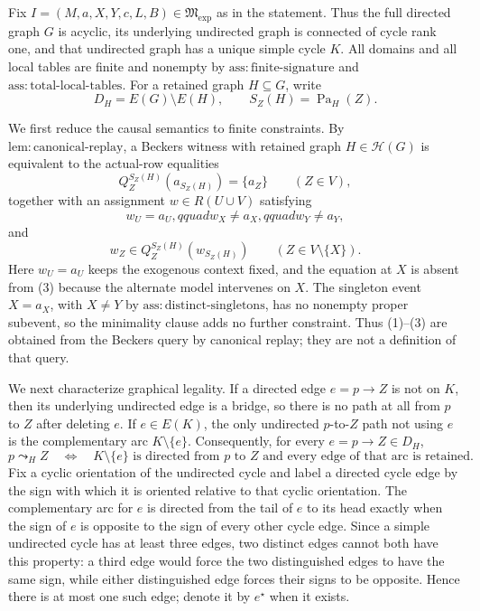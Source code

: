 Fix \(I=(M,a,X,Y,c,L,B)\in\mathfrak M_{\mathrm{exp}}\) as in the statement.  Thus the full directed graph \(G\) is acyclic, its underlying undirected graph is connected of cycle rank one, and that undirected graph has a unique simple cycle \(K\).  All domains and all local tables are finite and nonempty by \(\mathrm{ass:finite\mbox{-}signature}\) and \(\mathrm{ass:total\mbox{-}local\mbox{-}tables}\).  For a retained graph \(H\subseteq G\), write
\[
 D_H=E(G)\setminus E(H),
 \qquad
 S_Z(H)=\operatorname{Pa}_H(Z).
\]

We first reduce the causal semantics to finite constraints.  By \(\mathrm{lem:canonical\mbox{-}replay}\), a Beckers witness with retained graph \(H\in\mathcal H(G)\) is equivalent to the actual-row equalities
\[
 Q_Z^{S_Z(H)}(a_{S_Z(H)})=\{a_Z\}
 \qquad (Z\in V),                                                     \tag{1}
\]
together with an assignment \(w\in R(U\cup V)\) satisfying
\[
 w_U=a_U,qquad w_X\ne a_X,qquad w_Y\ne a_Y,                         \tag{2}
\]
and
\[
 w_Z\in Q_Z^{S_Z(H)}(w_{S_Z(H)})
 \qquad (Z\in V\setminus\{X\}).                                     \tag{3}
\]
Here \(w_U=a_U\) keeps the exogenous context fixed, and the equation at \(X\) is absent from (3) because the alternate model intervenes on \(X\).  The singleton event \(X=a_X\), with \(X\ne Y\) by \(\mathrm{ass:distinct\mbox{-}singletons}\), has no nonempty proper subevent, so the minimality clause adds no further constraint.  Thus (1)--(3) are obtained from the Beckers query by canonical replay; they are not a definition of that query.

We next characterize graphical legality.  If a directed edge \(e=p\to Z\) is not on \(K\), then its underlying undirected edge is a bridge, so there is no path at all from \(p\) to \(Z\) after deleting \(e\).  If \(e\in E(K)\), the only undirected \(p\)-to-\(Z\) path not using \(e\) is the complementary arc \(K\setminus\{e\}\).  Consequently, for every \(e=p\to Z\in D_H\),
\[
 p\leadsto_H Z
 \quad\Longleftrightarrow\quad
 K\setminus\{e\}\text{ is directed from \(p\) to \(Z\) and every edge of that arc is retained}.       \tag{4}
\]
Fix a cyclic orientation of the undirected cycle and label a directed cycle edge by the sign with which it is oriented relative to that cyclic orientation.  The complementary arc for \(e\) is directed from the tail of \(e\) to its head exactly when the sign of \(e\) is opposite to the sign of every other cycle edge.  Since a simple undirected cycle has at least three edges, two distinct edges cannot both have this property: a third edge would force the two distinguished edges to have the same sign, while either distinguished edge forces their signs to be opposite.  Hence there is at most one such edge; denote it by \(e^\star\) when it exists.

